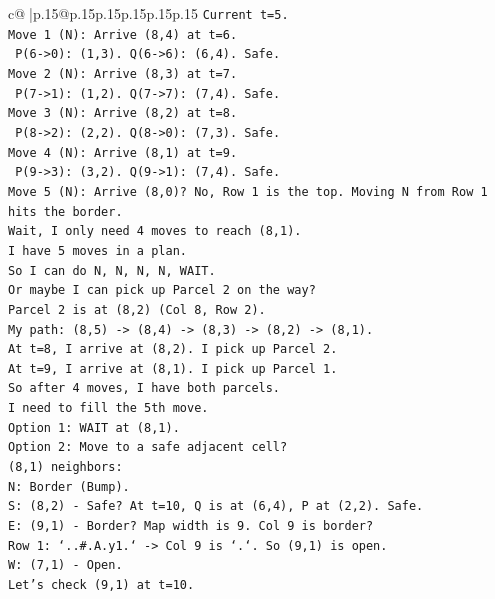 \documentclass{article}
\begin{document}
{\begin{supertabular}{c@{$\;$}|p{.15\linewidth}@{}p{.15\linewidth}p{.15\linewidth}p{.15\linewidth}p{.15\linewidth}p{.15\linewidth}}
{{{\texttt{Current t=5.} \\
\texttt{Move 1 (N): Arrive (8,4) at t=6.} \\
\texttt{  P(6{-}>0): (1,3). Q(6{-}>6): (6,4). Safe.} \\
\texttt{Move 2 (N): Arrive (8,3) at t=7.} \\
\texttt{  P(7{-}>1): (1,2). Q(7{-}>7): (7,4). Safe.} \\
\texttt{Move 3 (N): Arrive (8,2) at t=8.} \\
\texttt{  P(8{-}>2): (2,2). Q(8{-}>0): (7,3). Safe.} \\
\texttt{Move 4 (N): Arrive (8,1) at t=9.} \\
\texttt{  P(9{-}>3): (3,2). Q(9{-}>1): (7,4). Safe.} \\
\texttt{Move 5 (N): Arrive (8,0)? No, Row 1 is the top. Moving N from Row 1 hits the border.} \\
\texttt{Wait, I only need 4 moves to reach (8,1).} \\
\texttt{I have 5 moves in a plan.} \\
\texttt{So I can do N, N, N, N, WAIT.} \\
\texttt{Or maybe I can pick up Parcel 2 on the way?} \\
\texttt{Parcel 2 is at (8,2) (Col 8, Row 2).} \\
\texttt{My path: (8,5) {-}> (8,4) {-}> (8,3) {-}> (8,2) {-}> (8,1).} \\
\texttt{At t=8, I arrive at (8,2). I pick up Parcel 2.} \\
\texttt{At t=9, I arrive at (8,1). I pick up Parcel 1.} \\
\texttt{So after 4 moves, I have both parcels.} \\
\texttt{I need to fill the 5th move.} \\
\texttt{Option 1: WAIT at (8,1).} \\
\texttt{Option 2: Move to a safe adjacent cell?} \\
\texttt{(8,1) neighbors:} \\
\texttt{N: Border (Bump).} \\
\texttt{S: (8,2) {-} Safe? At t=10, Q is at (6,4), P at (2,2). Safe.} \\
\texttt{E: (9,1) {-} Border? Map width is 9. Col 9 is border?} \\
\texttt{Row 1: `..\#.A.y1.` {-}> Col 9 is `.`. So (9,1) is open.} \\
\texttt{W: (7,1) {-} Open.} \\
\texttt{Let's check (9,1) at t=10.} \\
}}}
\end{supertabular}}
\end{document}
